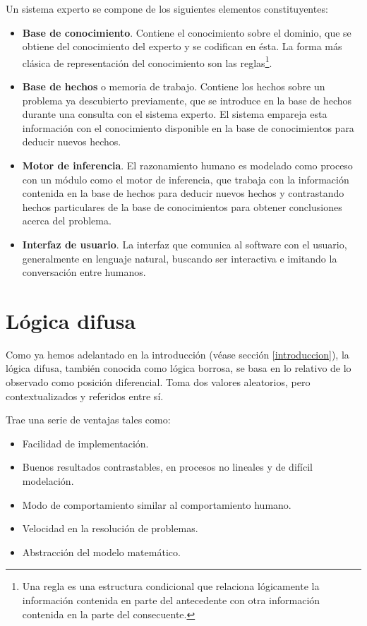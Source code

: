 \documentclass[a4paper, 11pt, titlepage]{article}
\begin{document}
        Un sistema experto se compone de los siguientes elementos constituyentes:

        \begin{itemize}
            \item \textbf{Base de conocimiento}. Contiene el conocimiento sobre el 
            dominio, que se obtiene del conocimiento del experto y se codifican en ésta.
            La forma más clásica de representación del conocimiento son las reglas\footnote{
                Una regla es una estructura condicional que relaciona lógicamente la 
                información contenida en parte del antecedente con otra información 
                contenida en la parte del consecuente.
            }.
            \item \textbf{Base de hechos} o memoria de trabajo. Contiene los hechos sobre 
            un problema ya descubierto previamente, que se introduce en la base de hechos 
            durante una consulta con el sistema experto. El sistema empareja esta información  
            con el conocimiento disponible en la base de conocimientos para deducir nuevos 
            hechos.
            \item \textbf{Motor de inferencia}. El razonamiento humano es modelado como proceso 
            con un módulo como el motor de inferencia, que trabaja con la información contenida 
            en la base de hechos para deducir nuevos hechos y contrastando hechos particulares 
            de la base de conocimientos para obtener conclusiones acerca del problema.
            \item \textbf{Interfaz de usuario}. La interfaz que comunica al software con el usuario, 
            generalmente en lenguaje natural, buscando ser interactiva e imitando la conversación
            entre humanos.
        \end{itemize}


\section{Lógica difusa}

    Como ya hemos adelantado en la introducción (véase sección \ref{introduccion}), la lógica difusa, 
    también conocida como lógica borrosa, se basa en lo relativo de lo observado como posición 
    diferencial. Toma dos valores aleatorios, pero contextualizados y referidos entre sí.

    Trae una serie de ventajas tales como:

    \begin{itemize}
        \item Facilidad de implementación.
        \item Buenos resultados contrastables, en procesos no lineales y de difícil modelación.
        \item Modo de comportamiento similar al comportamiento humano.
        \item Velocidad en la resolución de problemas.
        \item Abstracción del modelo matemático.
    \end{itemize}
\end{document}
